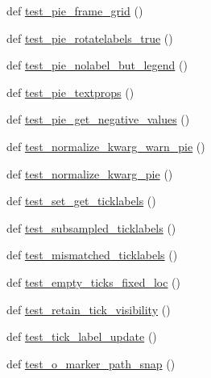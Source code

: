 \begin{DoxyCompactItemize}
\item 
def \hyperlink{namespacematplotlib_1_1tests_1_1test__axes_a308503e326082655e8ba37b330e449ff}{test\+\_\+pie\+\_\+frame\+\_\+grid} ()
\item 
def \hyperlink{namespacematplotlib_1_1tests_1_1test__axes_ad6179fd3bad1c88ec1376ee57aeb4c17}{test\+\_\+pie\+\_\+rotatelabels\+\_\+true} ()
\item 
def \hyperlink{namespacematplotlib_1_1tests_1_1test__axes_a4ba5e1546a7bcd0cd74ea586eb045583}{test\+\_\+pie\+\_\+nolabel\+\_\+but\+\_\+legend} ()
\item 
def \hyperlink{namespacematplotlib_1_1tests_1_1test__axes_a81756e25c0fe99ff27d9e43c3e314df8}{test\+\_\+pie\+\_\+textprops} ()
\item 
def \hyperlink{namespacematplotlib_1_1tests_1_1test__axes_aa3b9d5f76f8fbf0c5396f736b53b7d9d}{test\+\_\+pie\+\_\+get\+\_\+negative\+\_\+values} ()
\item 
def \hyperlink{namespacematplotlib_1_1tests_1_1test__axes_a3f6d9ee2189bfbb7e8503539d3507fae}{test\+\_\+normalize\+\_\+kwarg\+\_\+warn\+\_\+pie} ()
\item 
def \hyperlink{namespacematplotlib_1_1tests_1_1test__axes_a6667451cd93e3be272ca37258941913d}{test\+\_\+normalize\+\_\+kwarg\+\_\+pie} ()
\item 
def \hyperlink{namespacematplotlib_1_1tests_1_1test__axes_a616f5369a04b7c399a5aca15252e8d25}{test\+\_\+set\+\_\+get\+\_\+ticklabels} ()
\item 
def \hyperlink{namespacematplotlib_1_1tests_1_1test__axes_a36e453d2909fa00ae29036647d9db89b}{test\+\_\+subsampled\+\_\+ticklabels} ()
\item 
def \hyperlink{namespacematplotlib_1_1tests_1_1test__axes_adf4796655fe770803bdf87af480d4b07}{test\+\_\+mismatched\+\_\+ticklabels} ()
\item 
def \hyperlink{namespacematplotlib_1_1tests_1_1test__axes_a2934d5ecce371e3ea5ed86b8b2f41341}{test\+\_\+empty\+\_\+ticks\+\_\+fixed\+\_\+loc} ()
\item 
def \hyperlink{namespacematplotlib_1_1tests_1_1test__axes_adff085761a6e10768bd2b3512ac59cc7}{test\+\_\+retain\+\_\+tick\+\_\+visibility} ()
\item 
def \hyperlink{namespacematplotlib_1_1tests_1_1test__axes_afbc315a1efc74ffe7232bb715f0875ad}{test\+\_\+tick\+\_\+label\+\_\+update} ()
\item 
def \hyperlink{namespacematplotlib_1_1tests_1_1test__axes_a1a03df42835f606122d902f7b6668fe2}{test\+\_\+o\+\_\+marker\+\_\+path\+\_\+snap} ()
\item 

\end{DoxyCompactItemize}
